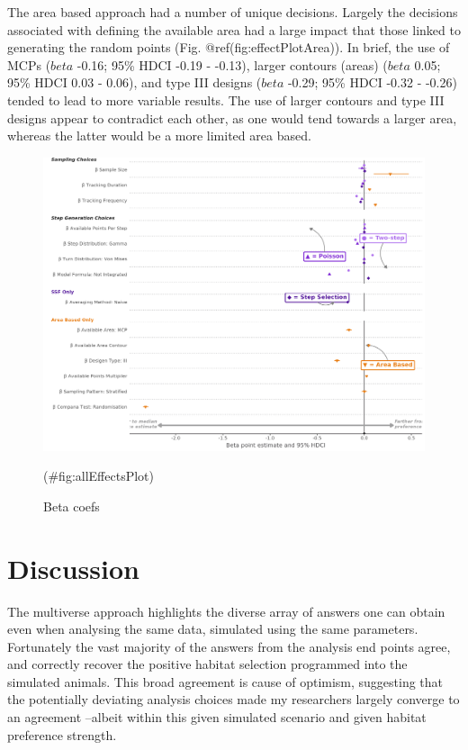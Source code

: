 \documentclass[10pt,a4paper]{article}
\begin{document}
The area based approach had a number of unique decisions.
Largely the decisions associated with defining the available area had a large impact that those linked to generating the random points (Fig. @ref(fig:effectPlotArea)).
In brief, the use of MCPs (\(beta\) -0.16; 95\% HDCI -0.19 - -0.13), larger contours (areas) (\(beta\) 0.05; 95\% HDCI 0.03 - 0.06), and type III designs (\(beta\) -0.29; 95\% HDCI -0.32 - -0.26) tended to lead to more variable results.
The use of larger contours and type III designs appear to contradict each other, as one would tend towards a larger area, whereas the latter would be a more limited area based.

\begin{figure}
\includegraphics[width=1\linewidth]{../figures/_allEffectsPlot} \caption{Beta coefs}(\#fig:allEffectsPlot)
\end{figure}

\section{Discussion}\label{discussion}

The multiverse approach highlights the diverse array of answers one can obtain even when analysing the same data, simulated using the same parameters.
Fortunately the vast majority of the answers from the analysis end points agree, and correctly recover the positive habitat selection programmed into the simulated animals.
This broad agreement is cause of optimism, suggesting that the potentially deviating analysis choices made my researchers largely converge to an agreement --albeit within this given simulated scenario and given habitat preference strength.
\end{document}

